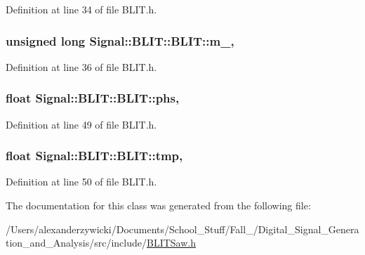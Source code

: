 Definition at line 34 of file B\+L\+I\+T.\+h.

\hypertarget{classSignal_1_1BLIT_1_1BLIT_a314aae37a0a53fa3f79a4466b9558fa5}{
\subsubsection[{m\+\_\+}]{\setlength{\rightskip}{0pt plus 5cm}unsigned long Signal\+::\+B\+L\+I\+T\+::\+B\+L\+I\+T\+::m\+\_\+\hspace{0.3cm}{\ttfamily [protected]}, {\ttfamily [inherited]}}}\label{classSignal_1_1BLIT_1_1BLIT_a314aae37a0a53fa3f79a4466b9558fa5}


Definition at line 36 of file B\+L\+I\+T.\+h.

\hypertarget{classSignal_1_1BLIT_1_1BLIT_afd06bf26696642f7eb400fb984e524f3}{
\subsubsection[{phs}]{\setlength{\rightskip}{0pt plus 5cm}float Signal\+::\+B\+L\+I\+T\+::\+B\+L\+I\+T\+::phs\hspace{0.3cm}{\ttfamily [protected]}, {\ttfamily [inherited]}}}\label{classSignal_1_1BLIT_1_1BLIT_afd06bf26696642f7eb400fb984e524f3}


Definition at line 49 of file B\+L\+I\+T.\+h.

\hypertarget{classSignal_1_1BLIT_1_1BLIT_aa543d207e6dd260762652221c598bae9}{
\subsubsection[{tmp}]{\setlength{\rightskip}{0pt plus 5cm}float Signal\+::\+B\+L\+I\+T\+::\+B\+L\+I\+T\+::tmp\hspace{0.3cm}{\ttfamily [protected]}, {\ttfamily [inherited]}}}\label{classSignal_1_1BLIT_1_1BLIT_aa543d207e6dd260762652221c598bae9}


Definition at line 50 of file B\+L\+I\+T.\+h.



The documentation for this class was generated from the following file\+:\begin{DoxyCompactItemize}
\item 
/\+Users/alexanderzywicki/\+Documents/\+School\+\_\+\+Stuff/\+Fall\+\_/\+Digital\+\_\+\+Signal\+\_\+\+Generation\+\_\+and\+\_\+\+Analysis/src/include/\hyperlink{BLITSaw_8h}{B\+L\+I\+T\+Saw.\+h}\end{DoxyCompactItemize}
